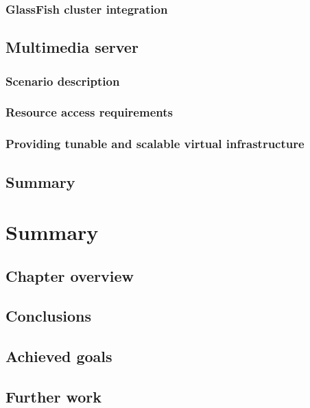 \documentclass[11pt]{book}
\begin{document}
      \subsection{GlassFish cluster integration}


    \section{Multimedia server}

      \subsection{Scenario description}

      \subsection{Resource access requirements}

      \subsection{Providing tunable and scalable virtual infrastructure}


    \section*{Summary}


  \chapter{Summary}

    \section*{Chapter overview}
	
		

    \section{Conclusions}
	
		

    \section{Achieved goals}
	
		

    \section{Further work}
	
\end{document}
